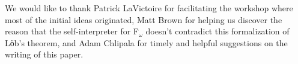 \acks We would like to thank Patrick LaVictoire for facilitating the
workshop where most of the initial ideas originated, Matt Brown for
helping us discover the reason that the self-interpreter for
F$_\omega$ doesn't contradict this formalization of Lӧb's theorem, and
Adam Chlipala for timely and helpful suggestions on the writing of
this paper.
